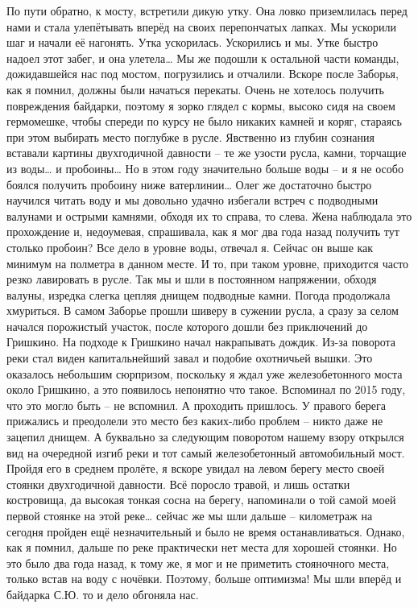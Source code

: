 По пути обратно, к мосту, встретили дикую утку. Она ловко приземлилась перед нами и стала улепётывать вперёд на своих перепончатых лапках. Мы ускорили шаг и начали её нагонять. Утка ускорилась. Ускорились и мы. Утке быстро надоел этот забег, и она улетела… Мы же подошли к остальной части команды, дожидавшейся нас под мостом, погрузились и отчалили. Вскоре после Заборья, как я помнил, должны были начаться перекаты.
Очень не хотелось получить повреждения байдарки, поэтому я зорко глядел с кормы, высоко сидя на своем гермомешке, чтобы спереди по курсу не было никаких камней и коряг, стараясь при этом выбирать место поглубже в русле. Явственно из глубин сознания вставали картины двухгодичной давности – те же узости русла, камни, торчащие из воды… и пробоины… Но в этом году значительно больше воды – и я не особо боялся получить пробоину ниже ватерлинии… Олег же достаточно быстро научился читать воду и мы довольно удачно избегали встреч с подводными валунами и острыми камнями, обходя их то справа, то слева. Жена наблюдала это прохождение и, недоумевая, спрашивала, как я мог два года назад получить тут столько пробоин? Все дело в уровне воды, отвечал я. Сейчас он выше как минимум на полметра в данном месте. И то, при таком уровне, приходится часто резко лавировать в русле. 
Так мы и шли в постоянном напряжении, обходя валуны, изредка слегка цепляя днищем подводные камни. Погода продолжала хмуриться. В самом Заборье прошли шиверу в сужении русла, а сразу за селом начался порожистый участок, после которого дошли без приключений до Гришкино. На подходе к Гришкино начал накрапывать дождик. Из-за поворота реки стал виден капитальнейший завал и подобие охотничьей вышки. Это оказалось небольшим сюрпризом, поскольку я ждал уже железобетонного моста около Гришкино, а это появилось непонятно что такое. Вспоминал по 2015 году, что это могло быть – не вспомнил. А проходить пришлось. У правого берега прижались и преодолели это место без каких-либо проблем – никто даже не зацепил днищем. А буквально за следующим поворотом нашему взору открылся вид на очередной изгиб реки и тот самый железобетонный автомобильный мост. 
Пройдя его в среднем пролёте, я вскоре увидал на левом берегу место своей стоянки двухгодичной давности. Всё поросло травой, и лишь остатки костровища, да высокая тонкая сосна на берегу, напоминали о той самой моей первой стоянке на этой реке… сейчас же мы шли дальше – километраж на сегодня пройден ещё незначительный и было не время останавливаться. Однако, как я помнил, дальше по реке практически нет места для хорошей стоянки. Но это было два года назад, к тому же, я мог и не приметить стояночного места, только встав на воду с ночёвки. Поэтому, больше оптимизма! Мы шли вперёд и байдарка С.Ю. то и дело обгоняла нас. 
